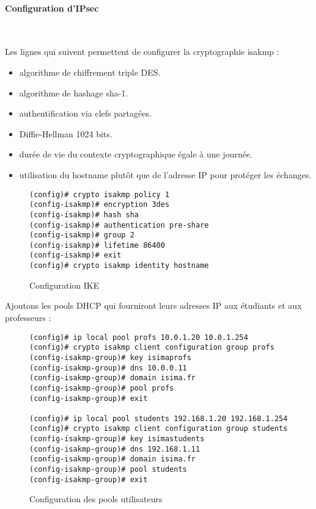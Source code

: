 \paragraph{Configuration d'IPsec}
~

Les lignes qui suivent permettent de configurer la cryptographie isakmp :
\begin{itemize}
	\item algorithme de chiffrement triple DES.
	\item algorithme de hashage sha-1.
	\item authentification via clefs partagées.
	\item Diffie-Hellman 1024 bits.
	\item durée de vie du contexte cryptographique égale à une journée.
	\item utilisation du hostname plutôt que de l'adresse IP pour protéger les échanges.
\end{itemize}


\begin{figure}[H]
	\begin{center}
		\begin{minipage}{0.90\textwidth}
			\begin{lstlisting}[frame=trBL]
(config)# crypto isakmp policy 1
(config-isakmp)# encryption 3des
(config-isakmp)# hash sha
(config-isakmp)# authentication pre-share
(config-isakmp)# group 2
(config-isakmp)# lifetime 86400
(config-isakmp)# exit
(config)# crypto isakmp identity hostname
			\end{lstlisting}
		\end{minipage}
	\end{center}
	\caption{Configuration IKE}
	\label{configuration_ike}
\end{figure}

Ajoutons les pools DHCP qui fourniront leurs adresses IP aux étudiants et aux professeurs :
\begin{figure}[H]
	\begin{center}
		\begin{minipage}{0.90\textwidth}
			\begin{lstlisting}[frame=trBL]
(config)# ip local pool profs 10.0.1.20 10.0.1.254
(config)# crypto isakmp client configuration group profs
(config-isakmp-group)# key isimaprofs
(config-isakmp-group)# dns 10.0.0.11
(config-isakmp-group)# domain isima.fr
(config-isakmp-group)# pool profs
(config-isakmp-group)# exit

(config)# ip local pool students 192.168.1.20 192.168.1.254
(config)# crypto isakmp client configuration group students
(config-isakmp-group)# key isimastudents
(config-isakmp-group)# dns 192.168.1.11
(config-isakmp-group)# domain isima.fr
(config-isakmp-group)# pool students
(config-isakmp-group)# exit
			\end{lstlisting}
		\end{minipage}
	\end{center}
	\caption{Configuration des pools utilisateurs}
	\label{configuration_pools_utilisateurs}
\end{figure}

